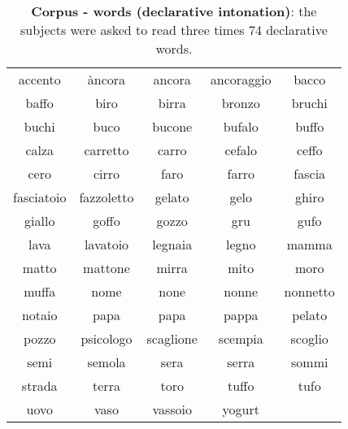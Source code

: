 \begin{table}[htbp]
  \begin{center}
  \begin{scriptsize}
	\begin{tabular}{ccccc}
	  \hline
	  accento & \`ancora & ancora & ancoraggio & bacco\\
	  baffo & biro & birra & bronzo & bruchi\\
	  buchi & buco & bucone & bufalo & buffo\\ 
	  calza & carretto & carro & cefalo & ceffo\\
	  cero & cirro & faro & farro & fascia\\
	  fasciatoio & fazzoletto & gelato & gelo & ghiro\\
	  giallo & goffo & gozzo & gru & gufo\\
	  lava & lavatoio & legnaia & legno & mamma\\
	  matto & mattone & mirra & mito & moro\\
	  muffa & nome & none & nonne & nonnetto\\
	  notaio & papa & papa & pappa & pelato\\
	  pozzo & psicologo & scaglione & scempia & scoglio\\
	  semi & semola & sera & serra & sommi\\
	  strada & terra & toro & tuffo & tufo\\
	  uovo & vaso & vassoio & yogurt & \\
	  \hline
  \end{tabular}
  \end{scriptsize}
  \end{center}
	\caption[Corpus - words (declarative intonation)]{\textbf{Corpus - words
	(declarative intonation)}: the subjects were asked to read three times 
	74 declarative words.}
 \label {tab:experiments:stimuli:wa}
\end{table}


